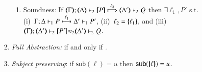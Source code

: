 \begin{definition}
\begin{enumerate}[1.]
\begin{enumerate}
			\item	Soundness:   
				If  $\wtytraarg{\mapt{\Gamma}}{\ell_2}{\mapt{\Delta}}{\map{P}}{\mapt{\Delta'}}{Q}{2}$
				then $\exists \ell_1, P'$ s.t.  \\
				(i)~$\stytraarg{\Gamma}{\ell_1}{\Delta}{P}{\Delta'}{P'}{1}$,
				(ii)~$\ell_2 = \mapa{\ell_1}$, and
				(iii)~
${\mapt{\Gamma}};{\mapt{\Delta'}}\proves_2 {\map{P'}}{\wb_2}
{\mapt{\Delta'}}\proves_2 {Q}$.

		\end{enumerate}
		
		\item \emph{Full Abstraction:} 
		if and only if
		.
		
		\item \emph{Subject preserving}: if $\mathsf{sub}(\ell) = u$ then $\mathsf{sub}(\mapa{\ell}) =u$.
	\end{enumerate}
\end{definition}

